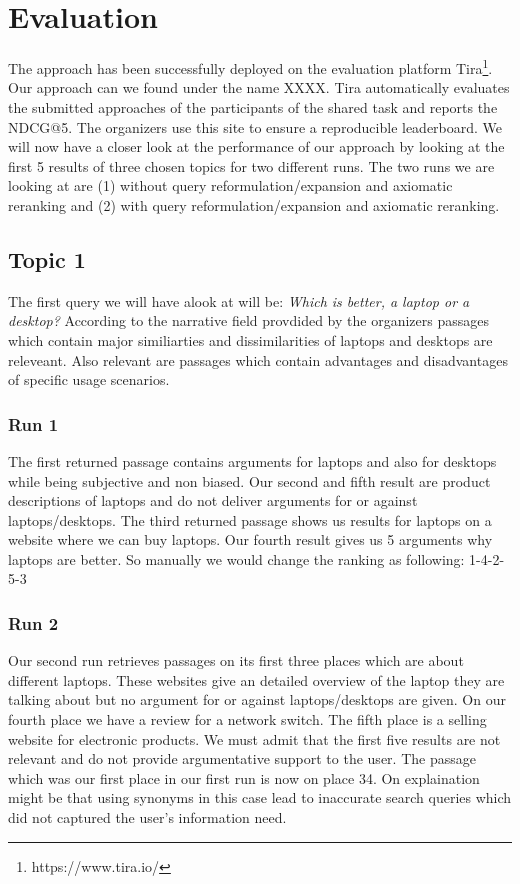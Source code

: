 \section{Evaluation} \label{evaluation}
    The approach has been successfully deployed on the evaluation platform Tira\footnote{https://www.tira.io/}. Our approach can we found under the name XXXX. Tira automatically evaluates the submitted approaches of the participants of the shared task and reports the NDCG@5. The organizers use this site to ensure a reproducible leaderboard. We will now have a closer look at the performance of our approach by looking at the first 5 results of three chosen topics for two different runs. The two runs we are looking at are (1) without query reformulation/expansion and axiomatic reranking and (2) with query reformulation/expansion and axiomatic reranking.
    \subsection{Topic 1}
        The first query we will have alook at will be: \textit{Which is better, a laptop or a desktop?} According to the narrative field provdided by the organizers passages which contain major similiarties and dissimilarities of laptops and desktops are releveant. Also relevant are passages which contain advantages and disadvantages of specific usage scenarios.
        \subsubsection*{Run 1}
            The first returned passage contains arguments for laptops and also for desktops while being subjective and non biased. Our second and fifth result are product descriptions of laptops and do not deliver arguments for or against laptops/desktops. The third returned passage shows us results for laptops on a website where we can buy laptops. Our fourth result gives us 5 arguments why laptops are better. So manually we would  change the ranking as following: 1-4-2-5-3
        \subsubsection*{Run 2}
            Our second run retrieves passages on its first three places which are about different laptops. These websites give an detailed overview of the laptop they are talking about but no argument for or against laptops/desktops are given. On our fourth place we have a review for a network switch. The fifth place is a selling website for electronic products. We must admit that the first five results are not relevant and do not provide argumentative support to the user. The passage which was our first place in our first run is now on place 34. On explaination might be that using synonyms in this case lead to inaccurate search queries which did not captured the user's information need.
